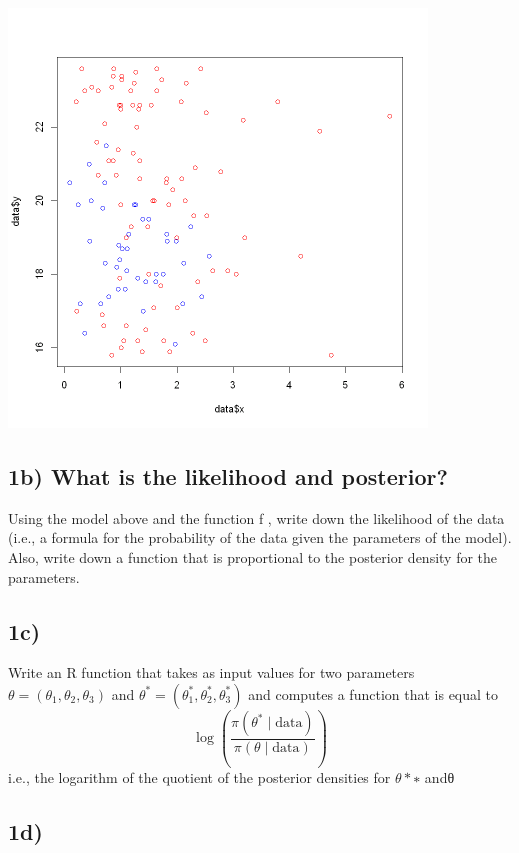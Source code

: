 \documentclass[
  letterpaper,
  DIV=11,
  numbers=noendperiod]{scrartcl}
\begin{document}
\includegraphics[width=4.375in,height=4.375in]{assignment2_files/figure-latex/cell-3-output-1.png}

\subsection{1b) What is the likelihood and
posterior?}\label{b-what-is-the-likelihood-and-posterior}

Using the model above and the function f , write down the likelihood of
the data (i.e., a formula for the probability of the data given the
parameters of the model). Also, write down a function that is
proportional to the posterior density for the parameters.

\subsection{1c)}\label{c}

Write an R function that takes as input values for two parameters
\(θ = (θ_1, θ_2, θ_3)\) and
\(\theta^{*}=(\theta_{1}^{*},\theta_{2}^{*},\theta_{3}^{*})\) and
computes a function that is equal to \[
\log\left(\frac{\pi(\theta^{*}\mid\mathrm{data})}{\pi(\theta\mid\mathrm{data})}\right)
\] i.e., the logarithm of the quotient of the posterior densities for
\(θ*∗\) andθ

\subsection{1d)}\label{d}
\end{document}
